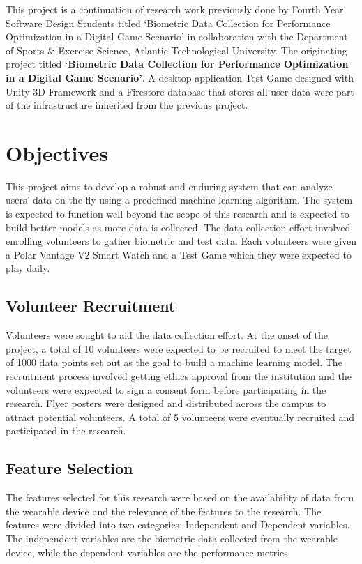 This project is a continuation of research work previously done by Fourth Year Software Design Students titled `Biometric
Data Collection for Performance Optimization in a Digital Game Scenario' in collaboration with the Department of Sports
\& Exercise Science, Atlantic Technological University.
The originating project titled \textbf{`Biometric Data Collection for Performance Optimization in a Digital 
Game Scenario'}. A desktop application Test Game designed with Unity 3D Framework and a Firestore database
that stores all user data were part of the infrastructure inherited from the previous project.

\section{Objectives}
This project aims to develop a robust and enduring system that can analyze users' data on the fly using a predefined machine learning
algorithm. The system is expected to function well beyond the scope of this research and is expected to build better models as more data
is collected. The data collection effort involved enrolling volunteers to gather biometric and test data. Each volunteers were given
a Polar Vantage V2 Smart Watch and a Test Game which they were expected to play daily.

\subsection{Volunteer Recruitment}
Volunteers were sought to aid the data collection effort. At the onset of the project, a total of 10 volunteers were expected to be recruited
to meet the target of 1000 data points set out as the goal to build a machine learning model. The recruitment process involved getting
ethics approval from the institution and the volunteers were expected to sign a consent form before participating in the research. 
Flyer posters were designed and distributed across the campus to attract potential volunteers. A total of 5 volunteers were eventually 
recruited and participated in the research. 

\subsection{Feature Selection}
The features selected for this research were based on the availability of data from the wearable device and the relevance of the
features to the research. The features were divided into two categories: Independent and Dependent variables. The independent
variables are the biometric data collected from the wearable device, while the dependent variables are the performance metrics


